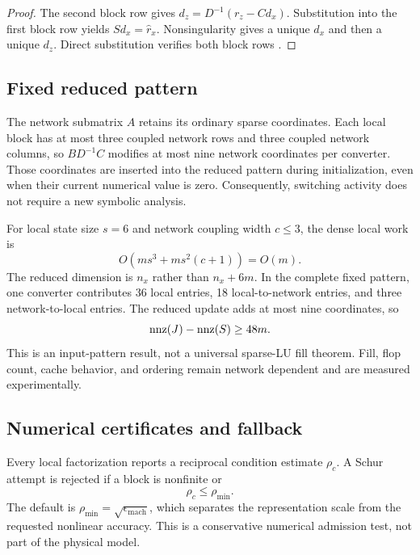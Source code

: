 \begin{proof}
The second block row gives $d_z=D^{-1}(r_z-Cd_x)$. Substitution into the first
block row yields $Sd_x=\widehat r_x$. Nonsingularity gives a unique $d_x$ and
then a unique $d_z$. Direct substitution verifies both block rows
\cite{golub2013matrix}.
\end{proof}

\subsection{Fixed reduced pattern}

The network submatrix $A$ retains its ordinary sparse coordinates. Each local
block has at most three coupled network rows and three coupled network columns,
so $BD^{-1}C$ modifies at most nine network coordinates per converter. Those
coordinates are inserted into the reduced pattern during initialization, even
when their current numerical value is zero. Consequently, switching activity
does not require a new symbolic analysis.

For local state size $s=6$ and network coupling width $c\le3$, the dense local
work is
\begin{equation}
 O\!\left(ms^3+ms^2(c+1)\right)=O(m).
 \label{eq:local-cost}
\end{equation}
The reduced dimension is $n_x$ rather than $n_x+6m$. In the complete fixed
pattern, one converter contributes 36 local entries, 18 local-to-network
entries, and three network-to-local entries. The reduced update adds at most
nine coordinates, so
\begin{equation}
 \operatorname{nnz}(J)-\operatorname{nnz}(S)\ge48m.
 \label{eq:nnz-bound}
\end{equation}
This is an input-pattern result, not a universal sparse-LU fill theorem. Fill,
flop count, cache behavior, and ordering remain network dependent
\cite{davis2006direct} and are measured experimentally.

\subsection{Numerical certificates and fallback}

Every local factorization reports a reciprocal condition estimate
$\rho_c$. A Schur attempt is rejected if a block is nonfinite or
\begin{equation}
 \rho_c\le\rho_{\min}.
\end{equation}
The default is
$\rho_{\min}=\sqrt{\epsilon_{\mathrm{mach}}}$, which separates the
representation scale from the requested nonlinear accuracy. This is a
conservative numerical admission test, not part of the physical model.

